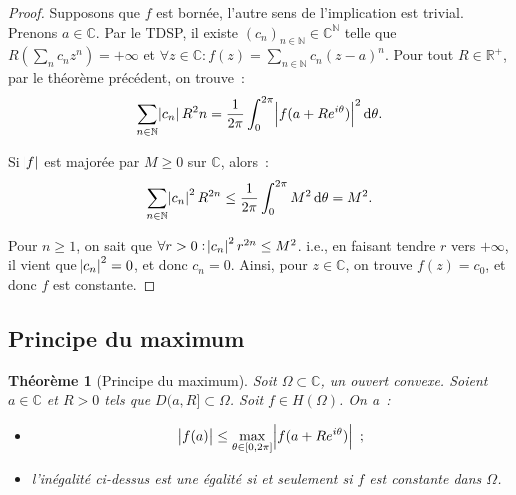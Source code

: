 \documentclass{report}
\newtheorem{thm}{Théorème}[chapter]
\theoremstyle{definition}
\theoremstyle{remark}
\numberwithin{equation}{section}
\newcommand{\C}{\mathbb C}
\newcommand{\R}{\mathbb R}
\newcommand{\N}{\mathbb N}
\newcommand{\pinfty}{{+\infty}}
\begin{document}
			\begin{proof} Supposons que $f$ est bornée, l'autre sens de l'implication est trivial. Prenons $a \in \C$. Par le TDSP, il existe $(c_n)_{n \in \N} \in \C^\N$
			telle que $R(\sum_n c_nz^n) = \pinfty$ et $\forall z \in \C : f(z) = \sum_{n \in \N}c_n(z-a)^n$. Pour tout $R \in \R^+$, par le théorème précédent, on trouve~:
			\begin{equation}
				\sum_{n \in \N}\abs {c_n}R^2n = \frac 1{2\pi}\int_0^{2\pi}\abs {f(a+Re^{i\theta})}^2\dif \theta.
			\end{equation}

			Si $\abs f$ est majorée par $M \geq 0$ sur $\C$, alors~:
			\begin{equation}
				\sum_{n \in \N}\abs {c_n}^2R^{2n} \leq \frac 1{2\pi}\int_0^{2\pi}M^2\dif \theta = M^2.
			\end{equation}

			Pour $n \geq 1$, on sait que $\forall r > 0 : \abs {c_n}^2r^{2n} \leq M^2$. i.e., en faisant tendre $r$ vers $\pinfty$, il vient que $\abs {c_n}^2 = 0$,
			et donc $c_n = 0$. Ainsi, pour $z \in \C$, on trouve $f(z) = c_0$, et donc $f$ est constante.
			\end{proof}

		\subsection{Principe du maximum}
			\begin{thm}[Principe du maximum] Soit $\Omega \subset \C$, un ouvert convexe. Soient $a \in \C$ et $R > 0$ tels que $D(a, R] \subset \Omega$.
			Soit $f \in H(\Omega)$. On a~:
			\begin{itemize}
				\item[$(i)$]  \begin{equation}\label{eq:principe max}\abs {f(a)} \leq \max_{\theta \in [0, 2\pi]}\abs {f(a+Re^{i\theta})}~;\end{equation}
				\item[$(ii)$] l'inégalité ci-dessus est une égalité si et seulement si $f$ est constante dans $\Omega$.
			\end{itemize}
			\end{thm}
\end{document}

